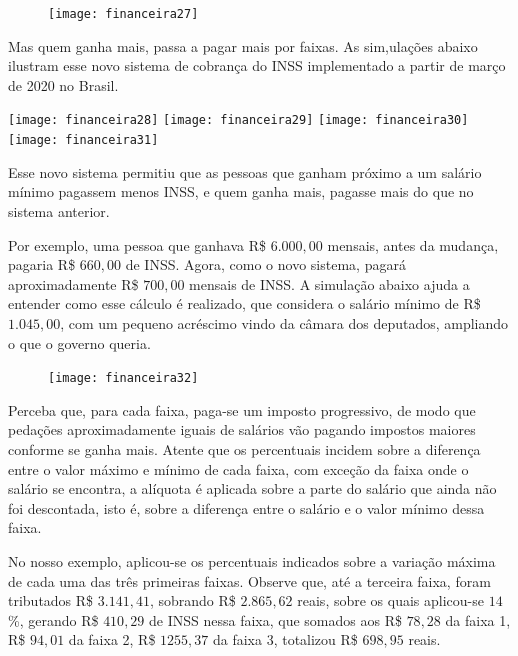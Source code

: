 \begin{figure}[H]
\centering

\texttt{[image: financeira27]}
\end{figure}

Mas quem ganha mais, passa a pagar mais por faixas. As sim,ulações abaixo ilustram esse novo sistema de cobrança do INSS implementado a partir de março de 2020 no Brasil.

\begin{multicols}{2}
\setlength{\columnsep}{-10pt}
\texttt{[image: financeira28]}
\texttt{[image: financeira29]}
\texttt{[image: financeira30]}
\texttt{[image: financeira31]}
\end{multicols}


Esse novo sistema permitiu que as pessoas que ganham próximo a um salário mínimo pagassem menos INSS, e quem ganha mais, pagasse mais do que no sistema anterior.

Por exemplo, uma pessoa que ganhava R\$ $6.000{,}00$ mensais, antes da mudança, pagaria R\$ $660{,}00$ de INSS. Agora, como o novo sistema, pagará aproximadamente R\$ $700{,}00$ mensais de INSS. A simulação abaixo ajuda a entender como esse cálculo é realizado, que considera o salário mínimo de R\$ $1.045{,}00$, com um pequeno acréscimo vindo da câmara dos deputados, ampliando o que o governo queria.

\begin{figure}[H]
\centering

\texttt{[image: financeira32]}
\end{figure}

Perceba que, para cada faixa, paga-se um imposto progressivo, de modo que pedações aproximadamente iguais de salários vão pagando impostos maiores conforme se ganha mais. Atente que os percentuais incidem sobre a diferença entre o valor máximo e mínimo de cada faixa, com exceção da faixa onde o salário se encontra, a alíquota é aplicada sobre a parte do salário que ainda não foi descontada, isto é, sobre a diferença entre o salário e o valor mínimo dessa faixa.

No nosso exemplo, aplicou-se os percentuais indicados sobre a variação máxima de cada uma das três primeiras faixas. Observe que, até a terceira faixa, foram tributados R\$ $3.141{,}41$, sobrando R\$ $2.865{,}62$ reais, sobre os quais aplicou-se $14$\%, gerando R\$ $410{,}29$ de INSS nessa faixa, que somados aos R\$ $78{,}28$ da faixa 1, R\$ $94{,}01$ da faixa 2, R\$ $1255{,}37$ da faixa 3, totalizou R\$ $698{,}95$ reais.

